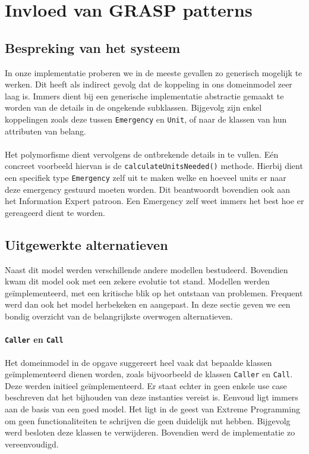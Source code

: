 \documentclass[a4paper, titlepage,12pt]{article}
\begin{document}
\section{Invloed van GRASP patterns}
\label{grasp}
\subsection{Bespreking van het systeem}
In onze implementatie proberen we in de meeste gevallen zo generisch mogelijk te werken. Dit heeft als indirect gevolg dat de koppeling in ons domeinmodel zeer laag is. Immers dient bij een generische implementatie abstractie gemaakt te worden van de details in de ongekende subklassen. Bijgevolg zijn enkel koppelingen zoals deze tussen \verb+Emergency+ en \verb+Unit+, of naar de klassen van hun attributen van belang.
\paragraph{}
Het polymorfisme dient vervolgens de ontbrekende details in te vullen. E\'en concreet voorbeeld hiervan is de \verb+calculateUnitsNeeded()+ methode. Hierbij dient een specifiek type \verb+Emergency+ zelf uit te maken welke en hoeveel units er naar deze emergency gestuurd moeten worden. Dit beantwoordt bovendien ook aan het Information Expert patroon. Een Emergency zelf weet immers het best hoe er gereageerd dient te worden.
\paragraph{}
\subsection{Uitgewerkte alternatieven}
Naast dit model werden verschillende andere modellen bestudeerd. Bovendien kwam dit model ook met een zekere evolutie tot stand. Modellen werden ge\"implementeerd, met een kritische blik op het ontstaan van problemen. Frequent werd dan ook het model herbekeken en aangepast. In deze sectie geven we een bondig overzicht van de belangrijkste overwogen alternatieven.
\paragraph{\texttt{Caller} en \texttt{Call}}
Het domeinmodel in de opgave suggereert heel vaak dat bepaalde klassen ge\"implementeerd dienen worden, zoals bijvoorbeeld de klassen \verb+Caller+ en \verb+Call+. Deze werden initieel ge\"implementeerd. Er staat echter in geen enkele use case beschreven dat het bijhouden van deze instanties vereist is. Eenvoud ligt immers aan de basis van een goed model. Het ligt in de geest van Extreme Programming om geen functionaliteiten te schrijven die geen duidelijk nut hebben. Bijgevolg werd besloten deze klassen te verwijderen. Bovendien werd de implementatie zo vereenvoudigd.
\end{document}
